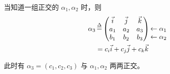 当知道一组正交的 $ \alpha_1,\alpha_2 $ 时，则
\begin{equation*}
    \begin{aligned}
        \alpha_3 &\mathop=\limits^\Delta \begin{pmatrix}
            \vec i&\vec j&\vec k\\ 
            a_1&a_2&a_3\\ 
            b_1&b_2&b_3
        \end{pmatrix}
        \begin{matrix}
            \\ \leftarrow \alpha_1 \\ \leftarrow\alpha_2
        \end{matrix}
        \\ &= c_i\vec i + c_j\vec j + c_k\vec k
    \end{aligned}
\end{equation*}

此时有 $ \alpha_3 = (c_1,c_2,c_3) $ 与 $ \alpha_1,\alpha_2 $
两两正交。


